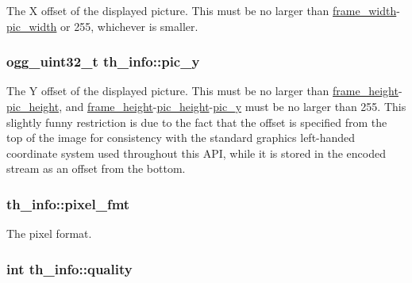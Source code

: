 The X offset of the displayed picture. This must be no larger than \hyperlink{structth__info_a6b8087a4d831da53011a43b8d74087a0}{frame\+\_\+width}-\/\hyperlink{structth__info_a5048edf77b141dd3e9a92ca85e317345}{pic\+\_\+width} or 255, whichever is smaller. \hypertarget{structth__info_a8aacc575cab2dfe3735001c2ad32aa14}{
\subsubsection[{pic\+\_\+y}]{\setlength{\rightskip}{0pt plus 5cm}ogg\+\_\+uint32\+\_\+t th\+\_\+info\+::pic\+\_\+y}}\label{structth__info_a8aacc575cab2dfe3735001c2ad32aa14}
The Y offset of the displayed picture. This must be no larger than \hyperlink{structth__info_a6b1adc3a16a8336a72692b0a5937214c}{frame\+\_\+height}-\/\hyperlink{structth__info_a775178474283c5990ba73f9ba7f6b88b}{pic\+\_\+height}, and \hyperlink{structth__info_a6b1adc3a16a8336a72692b0a5937214c}{frame\+\_\+height}-\/\hyperlink{structth__info_a775178474283c5990ba73f9ba7f6b88b}{pic\+\_\+height}-\/\hyperlink{structth__info_a8aacc575cab2dfe3735001c2ad32aa14}{pic\+\_\+y} must be no larger than 255. This slightly funny restriction is due to the fact that the offset is specified from the top of the image for consistency with the standard graphics left-\/handed coordinate system used throughout this A\+P\+I, while it is stored in the encoded stream as an offset from the bottom. \hypertarget{structth__info_a2301388ef3755c41ab12fd144c1fc54e}{
\subsubsection[{pixel\+\_\+fmt}]{ th\+\_\+info\+::pixel\+\_\+fmt}}\label{structth__info_a2301388ef3755c41ab12fd144c1fc54e}
The pixel format. \hypertarget{structth__info_aa4cdcf96cb46b256821993e9a830ee02}{
\subsubsection[{quality}]{\setlength{\rightskip}{0pt plus 5cm}int th\+\_\+info\+::quality}}\label{structth__info_aa4cdcf96cb46b256821993e9a830ee02}
